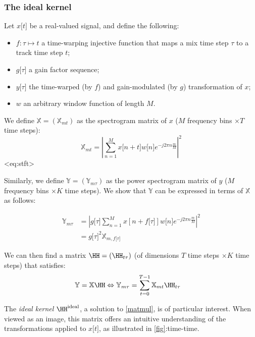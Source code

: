 \subsubsection{The ideal kernel}

Let \(x\lbrack t\rbrack\) be a real-valued signal, and define the
following:

\begin{itemize}
\item
  \(f:\tau \mapsto t\) a time-warping injective function that maps a mix
  time step \(\tau\) to a track time step \(t\);
\item
  \(g\lbrack\tau\rbrack\) a gain factor sequence;
\item
  \(y\lbrack\tau\rbrack\) the time-warped (by \(f\)) and gain-modulated
  (by \(g\)) transformation of \(x\);
\item
  \(w\) an arbitrary window function of length \(M\).
\end{itemize}

We define \({\mathbb{X}} = \left( {\mathbb{X}}_{mt} \right)\) as the
spectrogram matrix of \(x\) (\(M\) frequency bins \(\times T\) time
steps):
\[{\mathbb{X}}_{mt} = \left| {\sum_{n = 1}^{M}x\lbrack n + t\rbrack w\lbrack n\rbrack e^{- j2\pi n\frac{m}{M}}} \right|^{2}\]
\textless eq:stft\textgreater{}

Similarly, we define
\({\mathbb{Y}} = \left( {\mathbb{Y}}_{m\tau} \right)\) as the power
spectrogram matrix of \(y\) (\(M\) frequency bins \(\times K\) time
steps). We show that \(\mathbb{Y}\) can be expressed in terms of
\(\mathbb{X}\) as follows:

\[\begin{aligned}
{\mathbb{Y}}_{m\tau} & = \left| {g\lbrack\tau\rbrack\sum_{n = 1}^{M}x\left\lbrack n + f\lbrack\tau\rbrack \right\rbrack w\lbrack n\rbrack e^{- j2\pi n\frac{m}{M}}} \right|^{2} \\
 & = g\lbrack\tau\rbrack^{2}{\mathbb{X}}_{m,f\lbrack\tau\rbrack}
\end{aligned}\] \label{xy-relation}{}

We can then find a matrix
\(\HH = \left( \HH_{t\tau} \right)\) (of dimensions
\(T\) time steps \(\times K\) time steps) that satisfies:
\[\begin{aligned}
{\mathbb{Y}} & = {\mathbb{X}}\HH \Leftrightarrow {\mathbb{Y}}_{m\tau} = \sum_{t = 0}^{T - 1}{\mathbb{X}}_{mt}\HH_{t\tau}
\end{aligned}\] \label{matmul}{}

The \emph{ideal kernel} \(\HH^{\text{ideal}}\), a solution to
\hyperref[matmul]{{[}matmul{]}}, is of particular interest. When viewed
as an image, this matrix offers an intuitive understanding of the
transformations applied to \(x\lbrack t\rbrack\), as illustrated in
\hyperref[fig]{{[}fig{]}}:time-time.

